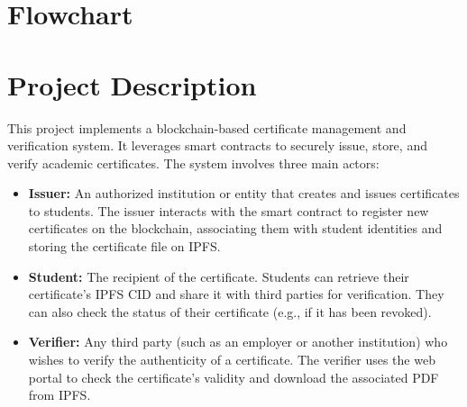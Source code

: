 \documentclass{article}
\begin{document}
\section{Flowchart}

\begin{center}
\end{center}

\section{Project Description}
This project implements a blockchain-based certificate management and verification system. It leverages smart contracts to securely issue, store, and verify academic certificates. The system involves three main actors:
\begin{itemize}
    \item \textbf{Issuer:} An authorized institution or entity that creates and issues certificates to students. The issuer interacts with the smart contract to register new certificates on the blockchain, associating them with student identities and storing the certificate file on IPFS.
    \item \textbf{Student:} The recipient of the certificate. Students can retrieve their certificate's IPFS CID and share it with third parties for verification. They can also check the status of their certificate (e.g., if it has been revoked).
    \item \textbf{Verifier:} Any third party (such as an employer or another institution) who wishes to verify the authenticity of a certificate. The verifier uses the web portal to check the certificate's validity and download the associated PDF from IPFS.
\end{itemize}
\end{document}
